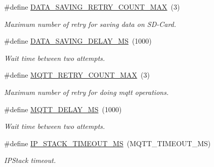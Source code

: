 \begin{DoxyCompactItemize}
\#define \hyperlink{rmap-config_8h_a81ed8eac7c6867ba31602628402f97c1}{D\+A\+T\+A\+\_\+\+S\+A\+V\+I\+N\+G\+\_\+\+R\+E\+T\+R\+Y\+\_\+\+C\+O\+U\+N\+T\+\_\+\+M\+AX}~(3)
\begin{DoxyCompactList}\small\item\em Maximum number of retry for saving data on S\+D-\/\+Card. \end{DoxyCompactList}\item 
\mbox{\label{rmap-config_8h_a511bba65f6e387335efa4c2ca6a9d948}} 
\#define \hyperlink{rmap-config_8h_a511bba65f6e387335efa4c2ca6a9d948}{D\+A\+T\+A\+\_\+\+S\+A\+V\+I\+N\+G\+\_\+\+D\+E\+L\+A\+Y\+\_\+\+MS}~(1000)
\begin{DoxyCompactList}\small\item\em Wait time between two attempts. \end{DoxyCompactList}\item 
\mbox{\label{rmap-config_8h_a823e4d8bca9ba0990f5c085dc997fafb}} 
\#define \hyperlink{rmap-config_8h_a823e4d8bca9ba0990f5c085dc997fafb}{M\+Q\+T\+T\+\_\+\+R\+E\+T\+R\+Y\+\_\+\+C\+O\+U\+N\+T\+\_\+\+M\+AX}~(3)
\begin{DoxyCompactList}\small\item\em Maximum number of retry for doing mqtt operations. \end{DoxyCompactList}\item 
\mbox{\label{rmap-config_8h_a4a9d04eab0c57e3143a6d1be60b73fb3}} 
\#define \hyperlink{rmap-config_8h_a4a9d04eab0c57e3143a6d1be60b73fb3}{M\+Q\+T\+T\+\_\+\+D\+E\+L\+A\+Y\+\_\+\+MS}~(1000)
\begin{DoxyCompactList}\small\item\em Wait time between two attempts. \end{DoxyCompactList}\item 
\mbox{\label{rmap-config_8h_a578ee6f26618a9f795fb5828663431f0}} 
\#define \hyperlink{rmap-config_8h_a578ee6f26618a9f795fb5828663431f0}{I\+P\+\_\+\+S\+T\+A\+C\+K\+\_\+\+T\+I\+M\+E\+O\+U\+T\+\_\+\+MS}~(M\+Q\+T\+T\+\_\+\+T\+I\+M\+E\+O\+U\+T\+\_\+\+MS)
\begin{DoxyCompactList}\small\item\em I\+P\+Stack timeout. \end{DoxyCompactList}\item 
\mbox{\label{rmap-config_8h_a7ac76db6c397b6167fb6dc9f4c88d6f3}} 

\end{DoxyCompactItemize}
